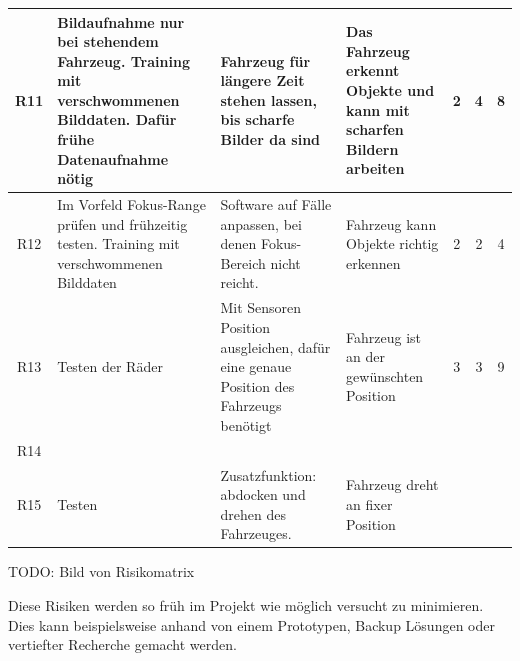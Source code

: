 \documentclass[../main.tex]{subfiles}
\begin{document}
\begin{landscape}
\begin{longtable}{|c|p{7cm}|p{5cm}|p{5cm}|c|c|c|}
R11 & Bildaufnahme nur bei stehendem Fahrzeug. Training mit verschwommenen Bilddaten. Dafür frühe Datenaufnahme nötig & Fahrzeug für längere Zeit stehen lassen, bis scharfe Bilder da sind & Das Fahrzeug erkennt Objekte und kann mit scharfen Bildern arbeiten & 2 & 4 & 8 \\ \hline
R12 & Im Vorfeld Fokus-Range prüfen und frühzeitig testen. Training mit verschwommenen Bilddaten & Software auf Fälle anpassen, bei denen Fokus-Bereich nicht reicht. & Fahrzeug kann Objekte richtig erkennen & 2 & 2 & 4 \\ \hline
R13 & Testen der Räder & Mit Sensoren Position ausgleichen, dafür eine genaue Position des Fahrzeugs benötigt & Fahrzeug ist an der gewünschten Position & 3 & 3 & 9 \\ \hline
R14 & & & & & & \\ \hline
R15 & Testen & Zusatzfunktion: abdocken und drehen des Fahrzeuges. & Fahrzeug dreht an fixer Position & & & \\ \hline
\end{longtable}

\normalsize
\end{landscape}

TODO: Bild von Risikomatrix

Diese Risiken werden so früh im Projekt wie möglich versucht zu minimieren.
Dies kann beispielsweise anhand von einem Prototypen, Backup Lösungen oder vertiefter Recherche gemacht werden.
\end{document}
